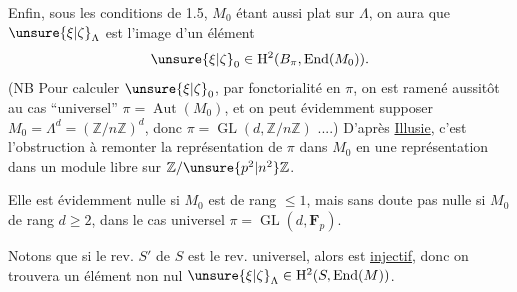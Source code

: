 Enfin, sous les conditions de 1.5, $M_0$ étant aussi plat sur $\Lambda$, on aura que $\unsure{\xi|\zeta}_\Lambda$ est l'image d'un élément
\[
\unsure{\xi|\zeta}_0\in\mathrm H^2(B_\pi,\operatorname{End}(M_0)).
\]
(NB Pour calculer $\unsure{\xi|\zeta}_0$, par fonctorialité en $\pi$, on est ramené aussitôt au cas ``universel'' $\pi=\operatorname{Aut}(M_0)$, et on peut évidemment supposer $M_0=\Lambda^d=(\mathbb Z/n\mathbb Z)^d$, donc $\pi=\operatorname{GL}(d,\mathbb Z/n\mathbb Z)$ ....) D'après \uline{Illusie}, c'est l'obstruction à remonter la représentation de $\pi$ dans $M_0$ en une représentation dans un module libre sur $\mathbb Z/\unsure{p^2|n^2}\mathbb Z$.

 Elle est évidemment nulle si $M_0$ est de rang $\leq1$, mais sans doute pas nulle si $M_0$ de rang $d\geq2$, dans le cas universel $\pi=\operatorname{GL}(d,\mathbf F_p)$.

Notons que si le rev. $S'$ de $S$ est le rev. universel, alors
est \uline{injectif}, donc on trouvera un élément non nul  $\unsure{\xi|\zeta}_\Lambda\in\mathrm H^2(S,\operatorname{End}(M))$.
